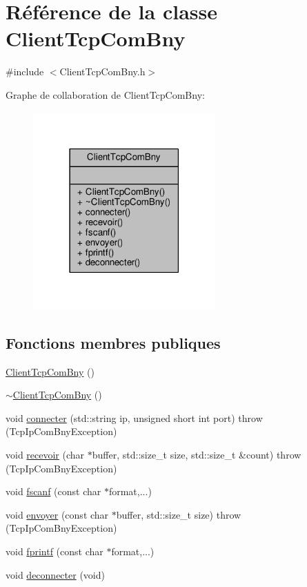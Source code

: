 \hypertarget{classClientTcpComBny}{}\section{Référence de la classe Client\+Tcp\+Com\+Bny}
\label{classClientTcpComBny}


{\ttfamily \#include $<$Client\+Tcp\+Com\+Bny.\+h$>$}



Graphe de collaboration de Client\+Tcp\+Com\+Bny\+:
\nopagebreak
\begin{figure}[H]
\begin{center}
\leavevmode
\includegraphics[width=198pt]{classClientTcpComBny__coll__graph}
\end{center}
\end{figure}
\subsection*{Fonctions membres publiques}
\begin{DoxyCompactItemize}
\item 
\hyperlink{classClientTcpComBny_a4e87071b400a5129f642a5a3721d420f}{Client\+Tcp\+Com\+Bny} ()
\item 
\hyperlink{classClientTcpComBny_ade30f75875dc873e2dc522228a7e5c68}{$\sim$\+Client\+Tcp\+Com\+Bny} ()
\item 
void \hyperlink{classClientTcpComBny_ac105b046c2e544b1a433f99d83d7447a}{connecter} (std\+::string ip, unsigned short int port)  throw (\+Tcp\+Ip\+Com\+Bny\+Exception)
\item 
void \hyperlink{classClientTcpComBny_ad32e6a288aeff3d243d88c60afe967c3}{recevoir} (char $\ast$buffer, std\+::size\+\_\+t size, std\+::size\+\_\+t \&count)  throw (\+Tcp\+Ip\+Com\+Bny\+Exception)
\item 
void \hyperlink{classClientTcpComBny_a0745845f86951740b6839812410608e8}{fscanf} (const char $\ast$format,...)
\item 
void \hyperlink{classClientTcpComBny_acf5ac7ad2c6815e6797a95f50906172f}{envoyer} (const char $\ast$buffer, std\+::size\+\_\+t size)  throw (\+Tcp\+Ip\+Com\+Bny\+Exception)
\item 
void \hyperlink{classClientTcpComBny_a3f2db7ecde5bf993a96bae8f4107e1c8}{fprintf} (const char $\ast$format,...)
\item 
void \hyperlink{classClientTcpComBny_aec1398f686da1f83884fd98924cc0725}{deconnecter} (void)
\end{DoxyCompactItemize}


